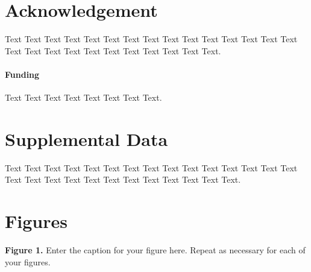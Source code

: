 \documentclass{frontiersMED} %
\begin{document}
\section*{Acknowledgement}
Text Text Text Text Text Text  Text Text Text Text Text Text Text Text  Text Text Text Text Text Text Text Text Text  Text Text Text.

\paragraph{Funding\textcolon} Text Text Text Text Text Text  Text Text.

\section*{Supplemental Data}
Text Text Text Text Text Text  Text Text Text Text Text Text Text Text Text  Text Text Text Text Text Text Text Text Text  Text Text Text.



\section*{Figures}




 \textbf{Figure 1.}{ Enter the caption for your figure here.  Repeat as  necessary for each of your figures.}\label{fig:01}%


\end{document}

